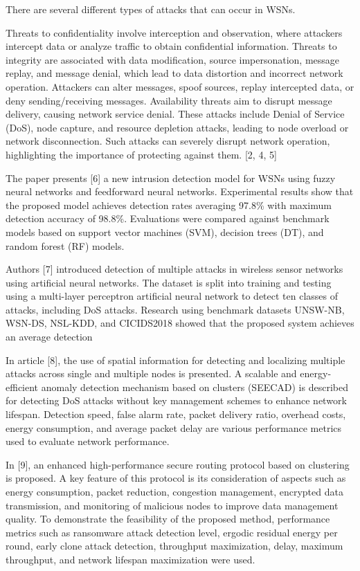 \begin{multicols}{2}
There are several different types of attacks that can occur in WSNs.

Threats to confidentiality involve interception and observation, where
attackers intercept data or analyze traffic to obtain confidential
information. Threats to integrity are associated with data modification,
source impersonation, message replay, and message denial, which lead to
data distortion and incorrect network operation. Attackers can alter
messages, spoof sources, replay intercepted data, or deny
sending/receiving messages. Availability threats aim to disrupt message
delivery, causing network service denial. These attacks include Denial
of Service (DoS), node capture, and resource depletion attacks, leading
to node overload or network disconnection. Such attacks can severely
disrupt network operation, highlighting the importance of protecting
against them. {[}2, 4, 5{]}

The paper presents {[}6{]} a new intrusion detection model for WSNs
using fuzzy neural networks and feedforward neural networks.
Experimental results show that the proposed model achieves detection
rates averaging 97.8\% with maximum detection accuracy of 98.8\%.
Evaluations were compared against benchmark models based on support
vector machines (SVM), decision trees (DT), and random forest (RF)
models.

Authors {[}7{]} introduced detection of multiple attacks in wireless
sensor networks using artificial neural networks. The dataset is split
into training and testing using a multi-layer perceptron artificial
neural network to detect ten classes of attacks, including DoS attacks.
Research using benchmark datasets UNSW-NB, WSN-DS, NSL-KDD, and
CICIDS2018 showed that the proposed system achieves an average detection

In article {[}8{]}, the use of spatial information for detecting and
localizing multiple attacks across single and multiple nodes is
presented. A scalable and energy-efficient anomaly detection mechanism
based on clusters (SEECAD) is described for detecting DoS attacks
without key management schemes to enhance network lifespan. Detection
speed, false alarm rate, packet delivery ratio, overhead costs, energy
consumption, and average packet delay are various performance metrics
used to evaluate network performance.

In {[}9{]}, an enhanced high-performance secure routing protocol based
on clustering is proposed. A key feature of this protocol is its
consideration of aspects such as energy consumption, packet reduction,
congestion management, encrypted data transmission, and monitoring of
malicious nodes to improve data management quality. To demonstrate the
feasibility of the proposed method, performance metrics such as
ransomware attack detection level, ergodic residual energy per round,
early clone attack detection, throughput maximization, delay, maximum
throughput, and network lifespan maximization were used.


\end{multicols}
